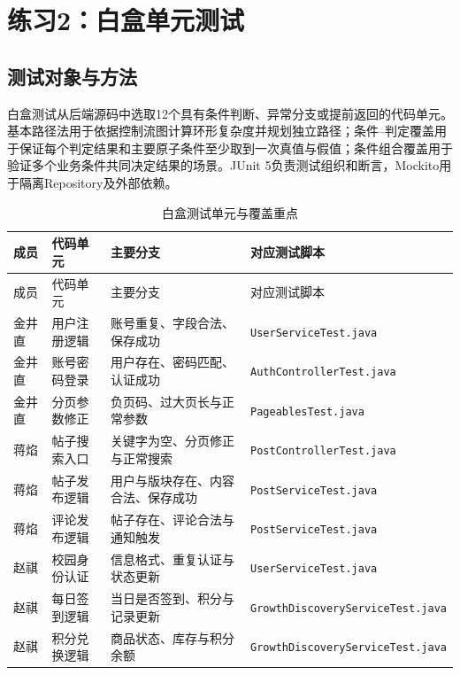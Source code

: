 \documentclass[bwprint]{report}
\begin{document}
\section{练习2：白盒单元测试}

\subsection{测试对象与方法}
白盒测试从后端源码中选取12个具有条件判断、异常分支或提前返回的代码单元。基本路径法用于依据控制流图计算环形复杂度并规划独立路径；条件--判定覆盖用于保证每个判定结果和主要原子条件至少取到一次真值与假值；条件组合覆盖用于验证多个业务条件共同决定结果的场景。JUnit 5负责测试组织和断言，Mockito用于隔离Repository及外部依赖。

\begin{longtable}{P{2cm}P{3.5cm}P{4.1cm}P{4.7cm}}
\caption{白盒测试单元与覆盖重点}\label{tab:whitebox-units}\\
\toprule
成员 & 代码单元 & 主要分支 & 对应测试脚本 \\
\midrule
\endfirsthead
\toprule
成员 & 代码单元 & 主要分支 & 对应测试脚本 \\
\midrule
\endhead
金井直 & 用户注册逻辑 & 账号重复、字段合法、保存成功 & \texttt{UserServiceTest.java} \\
金井直 & 账号密码登录 & 用户存在、密码匹配、认证成功 & \texttt{AuthController\hspace{0pt}Test.java} \\
金井直 & 分页参数修正 & 负页码、过大页长与正常参数 & \texttt{PageablesTest.java} \\
蒋焰 & 帖子搜索入口 & 关键字为空、分页修正与正常搜索 & \texttt{PostController\hspace{0pt}Test.java} \\
蒋焰 & 帖子发布逻辑 & 用户与版块存在、内容合法、保存成功 & \texttt{PostServiceTest.java} \\
蒋焰 & 评论发布逻辑 & 帖子存在、评论合法与通知触发 & \texttt{PostServiceTest.java} \\
赵祺 & 校园身份认证 & 信息格式、重复认证与状态更新 & \texttt{UserServiceTest.java} \\
赵祺 & 每日签到逻辑 & 当日是否签到、积分与记录更新 & \texttt{GrowthDiscovery\hspace{0pt}Service\hspace{0pt}Test.java} \\
赵祺 & 积分兑换逻辑 & 商品状态、库存与积分余额 & \texttt{GrowthDiscovery\hspace{0pt}Service\hspace{0pt}Test.java} \\

\end{longtable}
\end{document}
